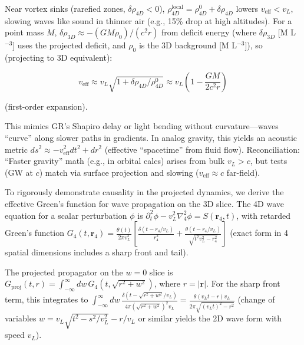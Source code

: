\documentclass{article}
\begin{document}
Near vortex sinks (rarefied zones, $\delta \rho_{4D} < 0$), $\rho_{4D}^{\text{local}} = \rho_{4D}^0 + \delta \rho_{4D}$ lowers $v_{\text{eff}} < v_L$, slowing waves like sound in thinner air (e.g., 15\% drop at high altitudes). For a point mass $M$, $\delta \rho_{3D} \approx - (G M \rho_0) / (c^2 r)$ from deficit energy (where $\delta \rho_{3D}$ [M L$^{-3}$] uses the projected deficit, and $\rho_0$ is the 3D background [M L$^{-3}$]), so (projecting to 3D equivalent):

\[
v_{\text{eff}} \approx v_L \sqrt{1 + \delta \rho_{4D} / \rho_{4D}^0} \approx v_L \left(1 - \frac{G M}{2 c^2 r}\right)
\]

(first-order expansion).

This mimics GR's Shapiro delay or light bending without curvature---waves ``curve'' along slower paths in gradients. In analog gravity, this yields an acoustic metric $ds^2 \approx - v_{\text{eff}}^2 dt^2 + dr^2$ (effective ``spacetime'' from fluid flow). Reconciliation: ``Faster gravity'' math (e.g., in orbital calcs) arises from bulk $v_L > c$, but tests (GW at $c$) match via surface projection and slowing ($v_{\text{eff}} \approx c$ far-field).

To rigorously demonstrate causality in the projected dynamics, we derive the effective Green's function for wave propagation on the 3D slice. The 4D wave equation for a scalar perturbation $\phi$ is $\partial_t^2 \phi - v_L^2 \nabla_4^2 \phi = S(\mathbf{r}_4, t)$, with retarded Green's function $G_4(t, \mathbf{r}_4) = \frac{\theta(t)}{2\pi v_L^2} \left[ \frac{\delta(t - r_4 / v_L)}{r_4^2} + \frac{\theta(t - r_4 / v_L)}{\sqrt{t^2 v_L^2 - r_4^2}} \right]$ (exact form in 4 spatial dimensions includes a sharp front and tail).

The projected propagator on the $w=0$ slice is $G_{\text{proj}}(t, r) = \int_{-\infty}^\infty dw \, G_4(t, \sqrt{r^2 + w^2})$, where $r = |\mathbf{r}|$. For the sharp front term, this integrates to $\int_{-\infty}^\infty dw \, \frac{\delta(t - \sqrt{r^2 + w^2} / v_L)}{4\pi (\sqrt{r^2 + w^2})^2 v_L} = \frac{\theta(v_L t - r) v_L}{2\pi \sqrt{(v_L t)^2 - r^2}}$ (change of variables $w = v_L \sqrt{t^2 - s^2 / v_L^2} - r / v_L$ or similar yields the 2D wave form with speed $v_L$).
\end{document}
